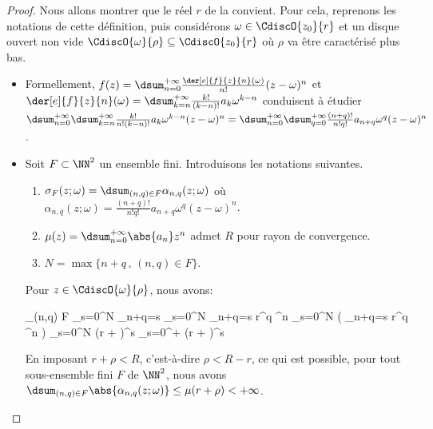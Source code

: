 \begin{proof}
	Nous allons montrer que le réel $r$ de la  convient.
	Pour cela, reprenons les notations de cette définition,
	puis
	considérons $\omega \in \CdiscO{z_0}{r}$
    et
    un disque ouvert non vide $\CdiscO{\omega}{\rho} \subseteq \CdiscO{z_0}{r}$ où $\rho$ va être caractérisé plus bas.
	\begin{itemize}
		\item Formellement,
		$f(z) = \dsum_{n = 0}^{+\infty} \frac{\der[e]{f}{z}{n}(\omega)}{n!} (z - \omega)^n$
		et
		$\der[e]{f}{z}{n}(\omega) = \dsum_{k = n}^{+\infty} \frac{k!}{(k-n)!} a_k \omega^{k - n}$
		conduisent à étudier
		$ \dsum_{n = 0}^{+\infty} \dsum_{k = n}^{+\infty} \frac{k!}{n! (k-n)!} a_k \omega^{k - n} (z - \omega)^n
		= \dsum_{n = 0}^{+\infty} \dsum_{q = 0}^{+\infty} \frac{(n+q)!}{n! q!} a_{n+q} \omega^q (z - \omega)^n$.
	

		\item Soit $F \subset \NN^2$ un ensemble fini.
		Introduisons les notations suivantes.
		\begin{enumerate}
			\item $\sigma_F(z ; \omega) = \dsum_{(n,q) \in F} \alpha_{n,q}(z ; \omega)$
			où
			$\alpha_{n,q}(z ; \omega) = \frac{(n+q)!}{n! q!} a_{n+q} \omega^q (z - \omega)^n$.

			\vspace{-7pt}
			\item $\mu(z) = \dsum_{n = 0}^{+\infty} \abs{a_n} z^n$ admet $R$ pour rayon de convergence.

			\item $N = \max \big\{ n + q \,,\, (n,q) \in F \big\}$.
		\end{enumerate}
		
		\noindent
		Pour $z \in \CdiscO{\omega}{\rho}$, nous avons:
		
		\noindent\kern-6pt
		\begin{stepcalc}[style=sar, ope=\leq]
			\dsum_{(n,q) \in F} 
		\explnext{}
			\dsum_{s=0}^{N} \dsum_{n+q=s} 
		\explnext{}
			\dsum_{s=0}^{N} \dsum_{n+q=s}   r^q \rho^n
		\explnext{}
			\dsum_{s=0}^{N}  \big( \dsum_{n+q=s}  r^q \rho^n \big)
		\explnext{}
			\dsum_{s=0}^{N}  (r + \rho)^s
		\explnext{}
			\dsum_{s=0}^{+\infty}  (r + \rho)^s
		\end{stepcalc}
		
		\noindent
		En imposant $r + \rho < R$, c'est-à-dire $\rho < R - r$, ce qui est possible, 
		pour tout sous-ensemble fini $F$ de $\NN^2$, nous avons
		$\dsum_{(n,q) \in F} \abs{\alpha_{n,q}(z ; \omega)} \leq \mu(r + \rho) < +\infty$.
		

\end{itemize}
\end{proof}
